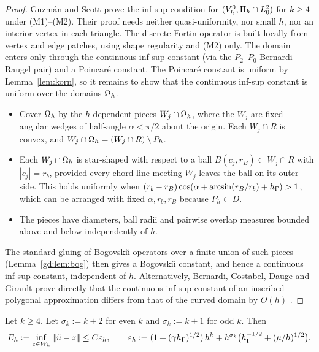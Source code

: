 \begin{proof}
Guzm\'an and Scott \cite[Theorem~1]{GuzmanScott2019} prove the inf-sup condition for $(V_h^0,\Pi_h\cap L^2_0)$ for $k\ge4$ under (M1)--(M2). Their proof needs neither quasi-uniformity, nor small $h$, nor an interior vertex in each triangle. The discrete Fortin operator is built locally from vertex and edge patches, using shape regularity and (M2) only. The domain enters only through the continuous inf-sup constant (via the $P_2$--$P_0$ Bernardi--Raugel pair) and a Poincar\'e constant. The Poincar\'e constant is uniform by Lemma~\ref{lem:korn}, so it remains to show that the continuous inf-sup constant is uniform over the domains $\Omega_h$.
\begin{itemize}
\item Cover $\Omega_h$ by the $h$-dependent pieces $W_j\cap\Omega_h$, where the $W_j$ are fixed angular wedges of half-angle $\alpha<\pi/2$ about the origin. Each $W_j\cap R$ is convex, and $W_j\cap\Omega_h=(W_j\cap R)\setminus P_h$.
\item Each $W_j\cap\Omega_h$ is star-shaped with respect to a ball $B(c_j,r_B)\subset W_j\cap R$ with $|c_j|=r_b$, provided every chord line meeting $W_j$ leaves the ball on its outer side. This holds uniformly when $(r_b-r_B)\cos(\alpha+\arcsin(r_B/r_b)+h_\Gamma)>1$, which can be arranged with fixed $\alpha,r_b,r_B$ because $P_h\subset D$.
\item The pieces have diameters, ball radii and pairwise overlap measures bounded above and below independently of $h$.
\end{itemize}
The standard gluing of Bogovski\u{\i} operators over a finite union of such pieces (Lemma~\ref{gd:lem:bog}) then gives a Bogovski\u{\i} constant, and hence a continuous inf-sup constant, independent of $h$. Alternatively, Bernardi, Costabel, Dauge and Girault prove directly that the continuous inf-sup constant of an inscribed polygonal approximation differs from that of the curved domain by $O(h)$ \cite[Theorem~4.6]{BCDG2016}. %
\end{proof}

\begin{lemma}[Approximation in $\Wh$]\label{lem:approx}
Let $k\ge4$.
Let $\sigma_k:=k+2$ for even $k$ and $\sigma_k:=k+1$ for odd $k$. Then
\[
E_h:=\inf_{z\in W_h}|\!|\!|\tilde u-z|\!|\!|\le C\varepsilon_h,\qquad \varepsilon_h:=(1+(\gamma h_\Gamma)^{1/2})\,h^k+h^{\sigma_k}\bigl(h_\Gamma^{-1/2}+(\mu/h)^{1/2}\bigr).
\]
\end{lemma}

